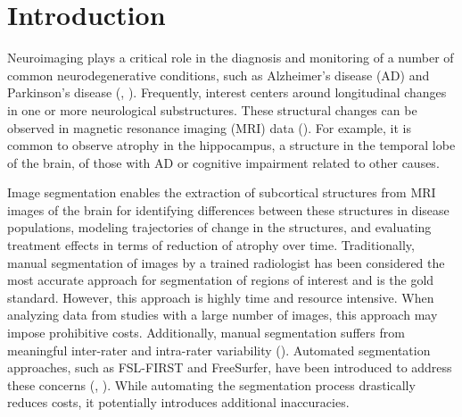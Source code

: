 \documentclass[11pt,reqno]{article}
\theoremstyle{definition}
\begin{document}
\section{Introduction}

Neuroimaging plays a critical role in the diagnosis and monitoring of a number of common neurodegenerative conditions, such as Alzheimer's disease (AD) and Parkinson's disease (\cite{knopmanAlzheimerDisease2021}, \cite{poeweParkinsonDisease2017}). Frequently, interest centers around longitudinal changes in one or more neurological substructures. These structural changes can be observed in magnetic resonance imaging (MRI) data (\cite{crainiceanu2016tutorial}). For example, it is common to observe atrophy in the hippocampus, a structure in the temporal lobe of the brain, of those with AD or cognitive impairment related to other causes.

Image segmentation enables the extraction of subcortical structures from MRI images of the brain for identifying differences between these structures in disease populations, modeling trajectories of change in the structures, and evaluating treatment effects in terms of reduction of atrophy over time. Traditionally, manual segmentation of images by a trained radiologist has been considered the most accurate approach for segmentation of regions of interest and is the gold standard. However, this approach is highly time and resource intensive. When analyzing data from studies with a large number of images, this approach may impose prohibitive costs. Additionally, manual segmentation suffers from meaningful inter-rater and intra-rater variability (\cite{boccardiSurveyProtocolsManual2011}). Automated segmentation approaches, such as FSL-FIRST and FreeSurfer, have been introduced to address these concerns (\cite{patenaudeBayesianModelShape2011}, \cite{reuterWithinsubjectTemplateEstimation2012}). While automating the segmentation process drastically reduces costs, it potentially introduces additional inaccuracies.
\end{document}
